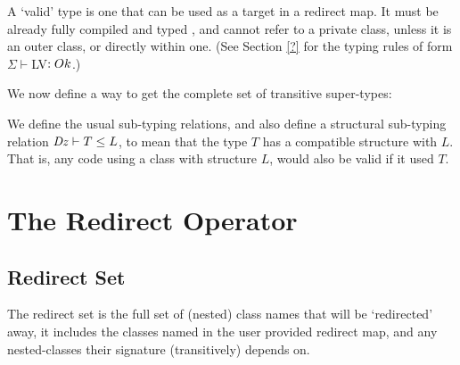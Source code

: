 A `valid' type is one that can be used as a target in a redirect map. It must be already fully compiled and typed , and cannot refer to a private class, unless it is an outer class, or directly within one. (See Section \ref{?} for the typing rules of form $\Sigma \vdash $LV$ : {Ok}$.)


We now define a way to get the complete set of transitive super-types:

\begin{defs}
\end{defs}

We define the usual sub-typing relations, and also define a structural sub-typing relation $\mathit{Dz} \vdash T \leq L$, to mean that the type $T$ has a compatible structure with $L$. That is, any code using a class with structure $L$, would also be valid if it used $T$.

\begin{defs}
{}
\end{defs}

\section{The Redirect Operator}

\subsection{Redirect Set}
The redirect set is the full set of (nested) class names that will be `redirected' away, it includes the classes named in the user provided redirect map, and any nested-classes their signature (transitively) depends on.

